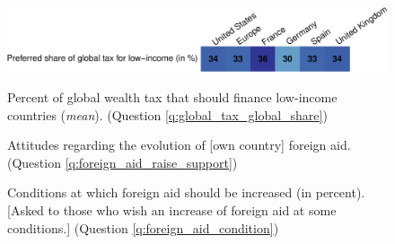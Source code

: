 \documentclass[12pt,english]{article}
\begin{document}
\begin{figure}
  \centering 
  \caption[Preferred share of wealth tax for low-income countries]{Percent of global wealth tax that should finance low-income countries (\textit{mean}). (Question \ref{q:global_tax_global_share})} %
  \includegraphics[width=1\textwidth]{../figures/country_comparison/global_tax_global_share_mean.pdf} \label{fig:global_share_mean}
\end{figure}


\begin{figure}[h!]
\caption[Attitudes on the evolution of foreign aid]{Attitudes regarding the evolution of [own country] foreign aid. (Question \ref{q:foreign_aid_raise_support})}\label{fig:foreign_aid_raise_support}
\end{figure}

\begin{figure}[h!]
\caption[Conditions at which foreign aid should be increased]{Conditions at which foreign aid should be increased (in percent). [Asked to those who wish an increase of foreign aid at some conditions.] (Question \ref{q:foreign_aid_condition})}\label{fig:foreign_aid_condition}
\end{figure}
\end{document}
